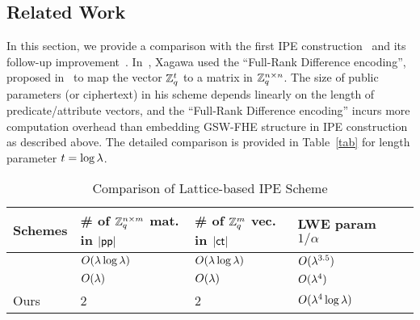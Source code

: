 \subsection{Related Work}
In this section, we provide a comparison with the first IPE construction~\cite{AC:AgrFreVai11} and its follow-up improvement~\cite{PKC:Xagawa13}. In~\cite{PKC:Xagawa13}, Xagawa used the ``Full-Rank Difference encoding'', proposed in~\cite{EC:AgrBonBoy10} to map the vector $\mathbb{Z}_q^t$ to a matrix in $\mathbb{Z}_q^{n \times n}$. The size of public parameters (or ciphertext) in his scheme depends linearly on the length of predicate/attribute vectors, and the ``Full-Rank Difference encoding'' incurs more computation overhead than embedding GSW-FHE structure in IPE construction as described above. The detailed comparison is provided in Table~\ref{tab} for length parameter $t = \log \lambda$.

\begin{table}[H]\label{tab}
\setlength\extrarowheight{2pt}
\setlength\tabcolsep{3pt}
\caption{Comparison of Lattice-based IPE Scheme} \label{tab:comparison}
 \begin{threeparttable}
\begin{tabularx}{\textwidth}{@{} l *{5}{C} @{}}
\hline
 Schemes
& \# of $\mathbb{Z}_q^{n \times m}$ mat. in $|\mathsf{pp}|$
&  \# of $\mathbb{Z}_q^m$ vec. in $|\mathsf{ct}|$
& LWE param $1 / \alpha$ \\ \hline
\cite{AC:AgrFreVai11} & $O(\lambda \log \lambda)$ & $O(\lambda \log \lambda)$ & $O(\lambda^{3.5})$ \\ \hline
\cite{PKC:Xagawa13} & $O(\lambda)$ & $O(\lambda)$ & $O(\lambda^4)$ \\ \hline
Ours  & 2 & 2 & $O(\lambda^{4} \log \lambda)$ \\ \hline
\end{tabularx}

 \end{threeparttable}
\end{table}





